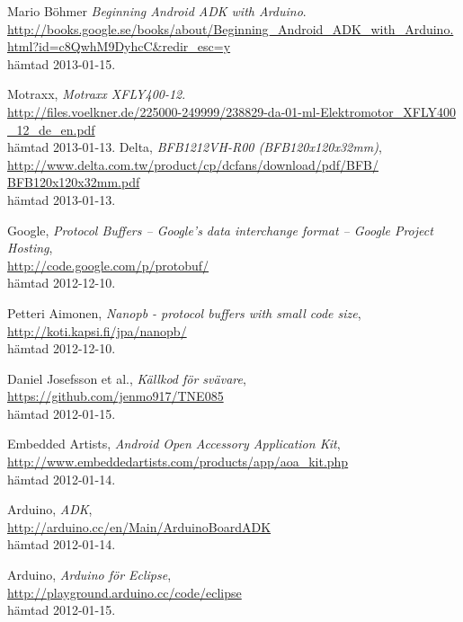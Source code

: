 \begin{thebibliography}{9}
Mario Böhmer
\emph{Beginning Android ADK with Arduino}. \\
\url{http://books.google.se/books/about/Beginning_Android_ADK_with_Arduino.html?id=c8QwhM9DyhcC&redir_esc=y}
\\
hämtad 2013-01-15.

Motraxx,
\emph{Motraxx XFLY400-12}. \\
\url{http://files.voelkner.de/225000-249999/238829-da-01-ml-Elektromotor_XFLY400
_12_de_en.pdf}
\\ hämtad 2013-01-13.
Delta,
\emph{BFB1212VH-R00 (BFB120x120x32mm)},\\
\url{http://www.delta.com.tw/product/cp/dcfans/download/pdf/BFB/
BFB120x120x32mm.pdf}
\\ hämtad 2013-01-13.

Google,
\emph{Protocol Buffers – Google's data interchange format – Google Project
Hosting}, \\
\url{http://code.google.com/p/protobuf/} \\
hämtad 2012-12-10.

Petteri Aimonen,
\emph{Nanopb - protocol buffers with small code size}, \\
\url{http://koti.kapsi.fi/jpa/nanopb/} \\
hämtad 2012-12-10.

Daniel Josefsson et al.,
\emph{Källkod för svävare}, \\
\url{https://github.com/jenmo917/TNE085} \\
hämtad 2012-01-15.

Embedded Artists,
\emph{Android Open Accessory Application Kit}, \\
\url{http://www.embeddedartists.com/products/app/aoa_kit.php} \\
hämtad 2012-01-14.

Arduino,
\emph{ADK}, \\
\url{http://arduino.cc/en/Main/ArduinoBoardADK} \\
hämtad 2012-01-14.

Arduino,
\emph{Arduino för Eclipse}, \\
\url{http://playground.arduino.cc/code/eclipse} \\
hämtad 2012-01-15.


\end{thebibliography}
